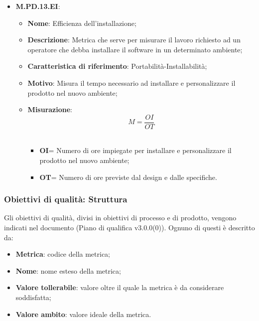 \documentclass[10pt, a4paper]{article}
\begin{document}
\begin{itemize}
        \item \textbf{M.PD.13.EI}:
    \begin{itemize}
        \item \textbf{Nome}: Efficienza dell'installazione;
        \item \textbf{Descrizione}: Metrica che serve per misurare il lavoro richiesto ad un operatore che debba installare il software in un determinato ambiente;
        \item \textbf{Caratteristica di riferimento}: Portabilità-Installabilità;
        \item \textbf{Motivo}: Misura il tempo necessario ad installare e personalizzare il prodotto nel nuovo ambiente; 
      \item \textbf{Misurazione}:   \[ M=\frac{OI}{OT} \] \\
       \begin{itemize}
           \item \textbf{OI}= Numero di ore impiegate per installare e personalizzare il prodotto nel nuovo ambiente;
           \item \textbf{OT}= Numero di ore previste dal design e dalle specifiche.\\
       \end{itemize}
    \end{itemize}
    
 \end{itemize}

    


   
       

   

    
   
    


\subsubsection{Obiettivi di qualità: Struttura}
Gli obiettivi di qualità, divisi in obiettivi di processo e di prodotto, vengono indicati nel documento (Piano di qualifica v3.0.0(0)). Ognuno di questi è descritto da:
\begin{itemize}
    \item \textbf{Metrica}: codice della metrica;
    \item \textbf{Nome}: nome esteso della metrica;
    \item \textbf{Valore tollerabile}: valore oltre il quale la metrica è da considerare soddisfatta;
    \item \textbf{Valore ambito}: valore ideale della metrica.
\end{itemize}
\end{document}
